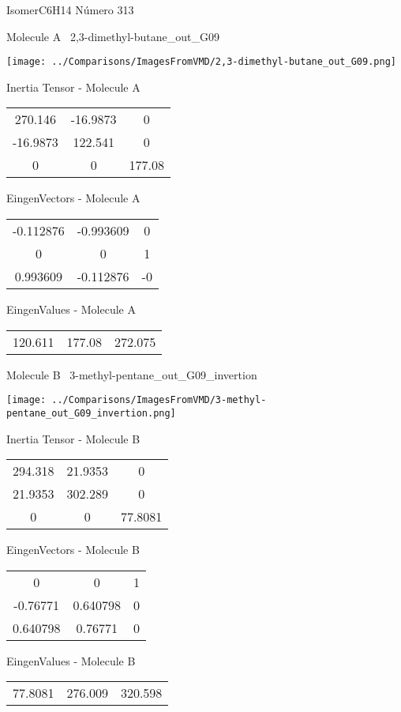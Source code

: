 \vtab[-3cm]
\begin{center}
{\large IsomerC6H14 \tab Número 313}
\end{center}
\begin{multicols}{2}
\begin{center}

Molecule A \
2,3-dimethyl-butane\_out\_G09

\texttt{[image: ../Comparisons/ImagesFromVMD/2,3-dimethyl-butane\_out\_G09.png]}

Inertia Tensor - Molecule A \\
\begin{tabular}{|c c c|}
270.146	 & 	-16.9873	 & 	0	 \\
-16.9873	 & 	122.541	 & 	0	 \\
0	 & 	0	 & 	177.08
\end{tabular}

\vtab
 EingenVectors - Molecule A     \\
\begin{tabular}{|c c c|}
-0.112876	 & 	-0.993609	 & 	0	 \\
0	 & 	0	 & 	1	 \\
0.993609	 & 	-0.112876	 & 	-0
\end{tabular}

\vtab
 EingenValues - Molecule A     \\
\begin{tabular}{|c c c|}
120.611	 & 	177.08	 & 	272.075	 \\
\end{tabular}
\columnbreak

Molecule B \
3-methyl-pentane\_out\_G09\_invertion

\texttt{[image: ../Comparisons/ImagesFromVMD/3-methyl-pentane\_out\_G09\_invertion.png]}

Inertia Tensor - Molecule B \\
\begin{tabular}{|c c c|}
294.318	 & 	21.9353	 & 	0	 \\
21.9353	 & 	302.289	 & 	0	 \\
0	 & 	0	 & 	77.8081
\end{tabular}

\vtab
 EingenVectors - Molecule B     \\
\begin{tabular}{|c c c|}
0	 & 	0	 & 	1	 \\
-0.76771	 & 	0.640798	 & 	0	 \\
0.640798	 & 	0.76771	 & 	0
\end{tabular}

\vtab
 EingenValues - Molecule B     \\
\begin{tabular}{|c c c|}
77.8081	 & 	276.009	 & 	320.598	 \\
\end{tabular}

\end{center}
\end{multicols}

